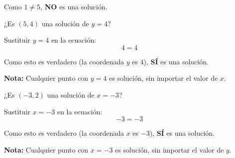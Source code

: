 \begin{exercise}
\begin{solucion}
Como $1 \neq 5$, \textbf{NO} es una solución.
\end{solucion}

\problem ¿Es $(5, 4)$ una solución de $y = 4$?

\begin{solucion}
Sustituir $y = 4$ en la ecuación:
$$4 = 4$$

Como esto es verdadero (la coordenada $y$ es 4), \textbf{SÍ} es una solución.

\textbf{Nota:} Cualquier punto con $y = 4$ es solución, sin importar el valor de $x$.
\end{solucion}

\problem ¿Es $(-3, 2)$ una solución de $x = -3$?

\begin{solucion}
Sustituir $x = -3$ en la ecuación:
$$-3 = -3$$

Como esto es verdadero (la coordenada $x$ es $-3$), \textbf{SÍ} es una solución.

\textbf{Nota:} Cualquier punto con $x = -3$ es solución, sin importar el valor de $y$.
\end{solucion}
\end{exercise}

